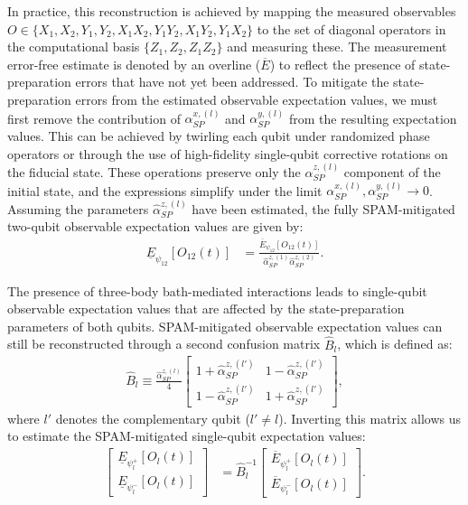 \documentclass[%
 reprint,
superscriptaddress,
 amsmath,amssymb,
 aps,
pra,
]{revtex4-2}
\begin{document}
In practice, this reconstruction is achieved by mapping the measured observables $O\in\{X_1,X_2,Y_1,Y_2,X_1X_2,Y_1Y_2,X_1Y_2,Y_1X_2\}$ to the set of diagonal operators in the computational basis \textemdash $\{Z_1,Z_2,Z_1Z_2\}$ \textemdash and measuring these. The measurement error-free estimate is denoted by an overline ($\overline{E}$) to reflect the presence of state-preparation errors that have not yet been addressed. To mitigate the state-preparation errors from the estimated observable expectation values, we must first remove the contribution of $\alpha_{SP}^{x,(l)}$ and $\alpha_{SP}^{y,(l)}$ from the resulting expectation values. This can be achieved by twirling each qubit under randomized phase operators or through the use of high-fidelity single-qubit corrective rotations on the fiducial state. These operations preserve only the $\alpha^{z,(l)}_{SP}$ component of the initial state, and the expressions simplify under the limit $\alpha^{x,(l)}_{SP},\alpha^{y,(l)}_{SP}\rightarrow 0$. Assuming the parameters $\hat{\alpha}^{z,(l)}_{SP}$ have been estimated, the fully SPAM-mitigated two-qubit observable expectation values are given by:
\begin{align}
    \underline{E}_{\psi_{12}}\left[O_{12}(t)\right]&=\frac{\overline{E}_{\psi_{12}}\left[O_{12}(t)\right]}{\hat{\alpha}^{z,(1)}_{SP}\hat{\alpha}^{z,(2)}_{SP}}.
\end{align}

The presence of three-body bath-mediated interactions leads to single-qubit observable expectation values that are affected by the state-preparation parameters of both qubits. SPAM-mitigated observable expectation values can still be reconstructed through a second confusion matrix $\hat{B}_l$, which is defined as:
\begin{align}
    \hat{B}_l\equiv\frac{\hat{\alpha}_{SP}^{z,(l)}}{4}\begin{bmatrix}
        1+\hat{\alpha}_{SP}^{z,(l')} & 1-\hat{\alpha}_{SP}^{z,(l')}\\
        1-\hat{\alpha}_{SP}^{z,(l')} & 1+\hat{\alpha}_{SP}^{z,(l')}
    \end{bmatrix},
\end{align}
where $l'$ denotes the complementary qubit ($l' \neq l$). Inverting this matrix allows us to estimate the SPAM-mitigated single-qubit expectation values:
\begin{align}
    \begin{bmatrix}
        \underline{E}_{\psi_l^+}\left[O_l(t)\right]\\
        \underline{E}_{\psi_l^-}\left[O_l(t)\right]
    \end{bmatrix}&=\hat{B}_l^{-1}\begin{bmatrix}
        \overline{E}_{\psi_l^+}\left[O_l(t)\right]\\
        \overline{E}_{\psi_l^-}\left[O_l(t)\right]
    \end{bmatrix}.
\end{align}
\end{document}
